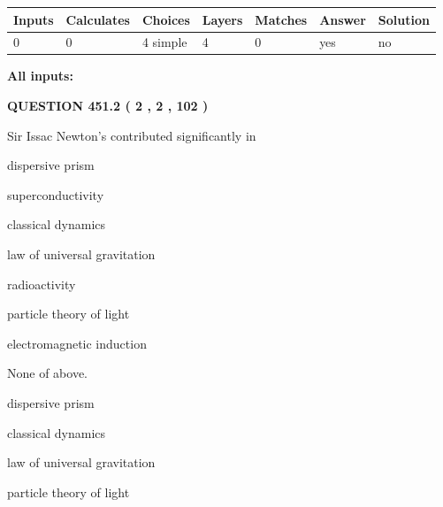 \documentclass[12pt]{article}
\begin{document}
 
   
   
   
   
\noindent\begin{tabular}{|l|l|l|l|l|l|l|}
 \hline
Inputs & Calculates & Choices & Layers & Matches & Answer & Solution \\ \hline
 0  & 
 0  & 
 4
  simple  
  & 
 4  & 
 0  & 
  yes & 
  no 
  \\ \hline
 \end{tabular}
   
   
   
   
\noindent{}
   
   
   
   
\noindent\vspace{0.1in}\hspace{-0.08in} {\textbf{\Large{All inputs: }}}
   
   
  
\vspace{0.2in}
  
{\textbf{\Large{QUESTION
451.2 
 ( 2 , 2 , 102 )
}}}
  
  
Sir Issac Newton's contributed significantly in
 
 
dispersive prism
 
 
superconductivity
 
 
classical dynamics
 
 
law of universal gravitation
 
 
radioactivity
 
 
particle theory of light
 
 
electromagnetic induction
 
 
 None of above.
 
 
\noindent{}
 
 
dispersive prism
 
 
classical dynamics
 
 
law of universal gravitation
 
 
particle theory of light
 
\end{document}
